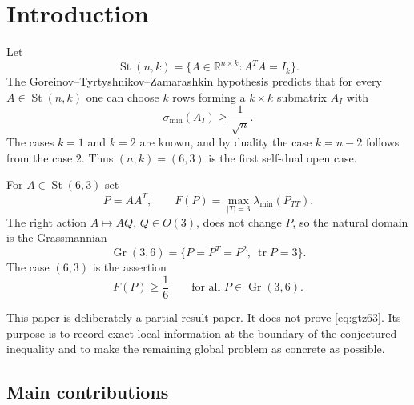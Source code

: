 \documentclass[11pt]{article}
\numberwithin{equation}{section}
\theoremstyle{definition}
\newcommand{\R}{\mathbb{R}}
\newcommand{\St}{\operatorname{St}}
\newcommand{\Gr}{\operatorname{Gr}}
\newcommand{\tr}{\operatorname{tr}}
\newcommand{\smin}{\sigma_{\min}}
\begin{document}
\section{Introduction}

Let
\[
  \St(n,k)=\{A\in\R^{n\times k}: A^TA=I_k\}.
\]
The Goreinov--Tyrtyshnikov--Zamarashkin hypothesis predicts that for every
$A\in\St(n,k)$ one can choose $k$ rows forming a $k\times k$ submatrix $A_I$ with
\[
  \smin(A_I)\ge \frac1{\sqrt n}.
\]
The cases $k=1$ and $k=2$ are known, and by duality the case $k=n-2$ follows from
the case $2$.  Thus $(n,k)=(6,3)$ is the first self-dual open case.

For $A\in\St(6,3)$ set
\[
  P=AA^T,\qquad F(P)=\max_{|T|=3}\lambda_{\min}(P_{TT}).
\]
The right action $A\mapsto AQ$, $Q\in O(3)$, does not change $P$, so the natural
domain is the Grassmannian
\[
  \Gr(3,6)=\{P=P^T=P^2,\ \tr P=3\}.
\]
The case $(6,3)$ is the assertion
\begin{equation}\label{eq:gtz63}
  F(P)\ge \frac16\qquad\text{for all }P\in\Gr(3,6).
\end{equation}

This paper is deliberately a partial-result paper.  It does not prove
\eqref{eq:gtz63}.  Its purpose is to record exact local information at the
boundary of the conjectured inequality and to make the remaining global problem
as concrete as possible.

\subsection*{Main contributions}
\end{document}
